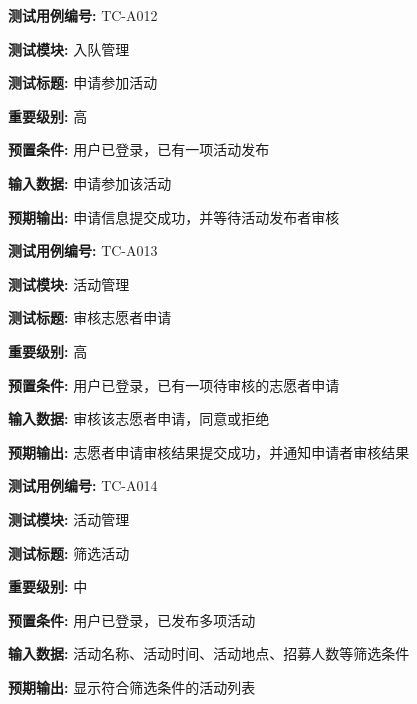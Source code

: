 \begin{framed} \textbf{测试用例编号:} TC-A012

\textbf{测试模块:} 入队管理

\textbf{测试标题:} 申请参加活动

\textbf{重要级别:} 高

\textbf{预置条件:} 用户已登录，已有一项活动发布

\textbf{输入数据:} 申请参加该活动

\textbf{预期输出:} 申请信息提交成功，并等待活动发布者审核

\begin{center}  \end{center} \end{framed}

\begin{framed} \textbf{测试用例编号:} TC-A013

\textbf{测试模块:} 活动管理

\textbf{测试标题:} 审核志愿者申请

\textbf{重要级别:} 高

\textbf{预置条件:} 用户已登录，已有一项待审核的志愿者申请

\textbf{输入数据:} 审核该志愿者申请，同意或拒绝

\textbf{预期输出:} 志愿者申请审核结果提交成功，并通知申请者审核结果

\begin{center}  \end{center} \end{framed}

\begin{framed} \textbf{测试用例编号:} TC-A014

\textbf{测试模块:} 活动管理

\textbf{测试标题:} 筛选活动

\textbf{重要级别:} 中

\textbf{预置条件:} 用户已登录，已发布多项活动

\textbf{输入数据:} 活动名称、活动时间、活动地点、招募人数等筛选条件

\textbf{预期输出:} 显示符合筛选条件的活动列表

\begin{center}  \end{center} \end{framed}